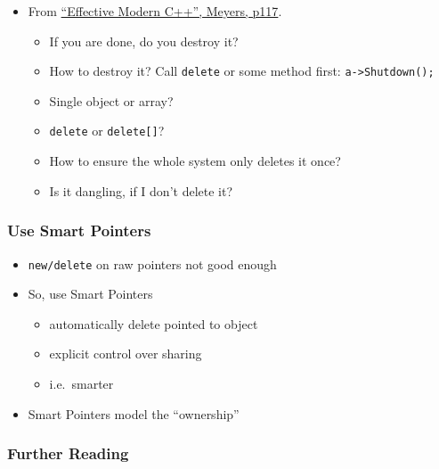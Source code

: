 \begin{itemize}
\itemsep1pt\parskip0pt
\item
  From
  \href{https://www.amazon.co.uk/Effective-Modern-Specific-Ways-Improve/dp/1491903996/ref=sr_1_1?ie=UTF8\&qid=1484571499\&sr=8-1\&keywords=Effective+Modern+C\%2B\%2B}{``Effective
  Modern C++'', Meyers, p117}.

  \begin{itemize}
  \itemsep1pt\parskip0pt
  \item
    If you are done, do you destroy it?
  \item
    How to destroy it? Call \texttt{delete} or some method first:
    \texttt{a-\textgreater{}Shutdown();}
  \item
    Single object or array?
  \item
    \texttt{delete} or \texttt{delete{[}{]}}?
  \item
    How to ensure the whole system only deletes it once?
  \item
    Is it dangling, if I don't delete it?
  \end{itemize}
\end{itemize}

\subsubsection{Use Smart Pointers}\label{use-smart-pointers}

\begin{itemize}
\itemsep1pt\parskip0pt
\item
  \texttt{new/delete} on raw pointers not good enough
\item
  So, use Smart Pointers

  \begin{itemize}
  \itemsep1pt\parskip0pt
  \item
    automatically delete pointed to object
  \item
    explicit control over sharing
  \item
    i.e.~smarter
  \end{itemize}
\item
  Smart Pointers model the ``ownership''
\end{itemize}

\subsubsection{Further Reading}\label{further-reading-1}

